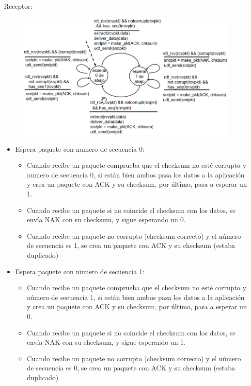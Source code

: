\documentclass[12pt, twoside, openright]{report} %
\begin{document}
\pagebreak
      Receptor:
	  \begin{figure}[H]
		{\includegraphics[scale=.45]{Untitled 13.png}}
	\end{figure}
      \begin{itemize}
      \item
        Espera paquete con numero de secuencia 0:

        \begin{itemize}
        \item
          Cuando recibe un paquete comprueba que el checksum no esté
          corrupto y numero de secuencia 0, si están bien ambos pasa los
          datos a la aplicación y crea un paquete con ACK y su checksum,
          por último, pasa a esperar un 1.
        \item
          Cuando recibe un paquete si no coincide el checksum con los
          datos, se envía NAK con su checksum, y sigue esperando un 0.
        \item
          Cuando recibe un paquete no corrupto (checksum correcto) y el
          número de secuencia es 1, se crea un paquete con ACK y su
          checksum (estaba duplicado)
        \end{itemize}
      \item
        Espera paquete con numero de secuencia 1:

        \begin{itemize}
        \item
          Cuando recibe un paquete comprueba que el checksum no esté
          corrupto y número de secuencia 1, si están bien ambos pasa los
          datos a la aplicación y crea un paquete con ACK y su checksum,
          por último, pasa a esperar un 0.
        \item
          Cuando recibe un paquete si no coincide el checksum con los
          datos, se envía NAK con su checksum, y sigue esperando un 1.
        \item
          Cuando recibe un paquete no corrupto (checksum correcto) y el
          número de secuencia es 0, se crea un paquete con ACK y su
          checksum (estaba duplicado)
        \end{itemize}
      \end{itemize}
\pagebreak
\end{document}
